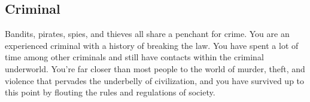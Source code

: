 \thispagestyle{empty}

\newpage

\subsection*{Criminal} \label{ssec::criminal}
    Bandits, pirates, spies, and thieves all share a penchant for crime.
    You are an experienced criminal with a history of breaking the law.
    You have spent a lot of time among other criminals and still have contacts within the criminal underworld.
    You're far closer than most people to the world of murder, theft, and violence that pervades the underbelly of civilization, and you have survived up to this point by flouting the rules and regulations of society.

